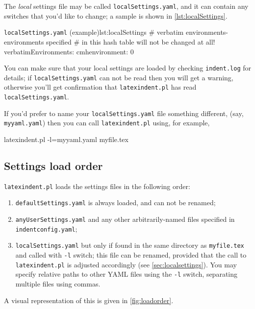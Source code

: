 	The \emph{local} settings file may be called \texttt{localSettings.yaml}, and
	it can contain any switches that you'd
	like to change; a sample is shown in \cref{lst:localSettings}.

	\begin{yaml}{\texttt{localSettings.yaml} (example)}{lst:localSettings}
	#  verbatim environments- environments specified
	#  in this hash table will not be changed at all!
	verbatimEnvironments:
	cmhenvironment: 0
\end{yaml}


	You can make sure that your local settings are loaded by checking \texttt{indent.log}
	for details; if \texttt{localSettings.yaml} can not be read then you will
	get a warning, otherwise you'll get confirmation that
	\texttt{latexindent.pl} has read \texttt{localSettings.yaml}.

	If you'd prefer to name your \texttt{localSettings.yaml} file something different, (say, \texttt{myyaml.yaml}) then
	you can call \texttt{latexindent.pl} using, for example,
	\begin{commandshell}
latexindent.pl -l=myyaml.yaml myfile.tex
\end{commandshell}

\subsection{Settings load order}\label{sec:loadorder}
	\texttt{latexindent.pl} loads the settings files in the following order:
	\begin{enumerate}
		\item \texttt{defaultSettings.yaml} is always loaded, and can not be renamed;
		\item \texttt{anyUserSettings.yaml} and any other arbitrarily-named files specified in \texttt{indentconfig.yaml};
		\item \texttt{localSettings.yaml} but only if found in the same directory as \texttt{myfile.tex} and called
		      with \texttt{-l} switch; this file can be renamed, provided that the call to \texttt{latexindent.pl} is adjusted
		      accordingly (see \cref{sec:localsettings}). You may specify relative  paths to other
		      YAML files using the \texttt{-l} switch, separating multiple files using commas.
	\end{enumerate}
	A visual representation of this is given in \cref{fig:loadorder}.

